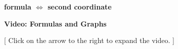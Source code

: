 \documentclass{ximera}
\begin{document}
\begin{center}
\textbf{\textcolor{purple!85!blue}{formula $\iff$ second coordinate}}
\end{center}






\begin{explanation} \textbf{\textcolor{red!75!green}{Video: Formulas and Graphs}}

[ Click on the arrow to the right to expand the video. ]
\begin{expandable} 

\begin{center}
\end{center}

\end{expandable}
\end{explanation}
\end{document}

